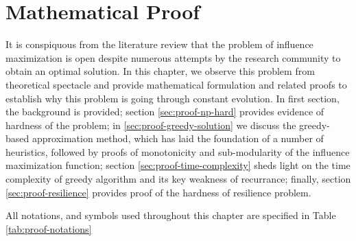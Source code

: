 \chapter{Mathematical Proof}
\label{chp:proof}

It is conspiquous from the literature review that the problem of influence maximization is open despite numerous attempts by the research community to obtain an optimal solution. In this chapter, we observe this problem from theoretical spectacle and provide mathematical formulation and related proofs to establish why this problem is going through constant evolution. In first section, the background is provided; section \ref{sec:proof-np-hard} provides evidence of hardness of the problem; in \ref{sec:proof-greedy-solution} we discuss the greedy-based approximation method, which has laid the foundation of a number of heuristics, followed by proofs of monotonicity and sub-modularity of the influence maximization function; section \ref{sec:proof-time-complexity} sheds light on the time complexity of greedy algorithm and its key weakness of recurrance; finally, section \ref{sec:proof-resilience} provides proof of the hardness of resilience problem.


All notations, and symbols used throughout this chapter are specified in Table \ref{tab:proof-notations}


